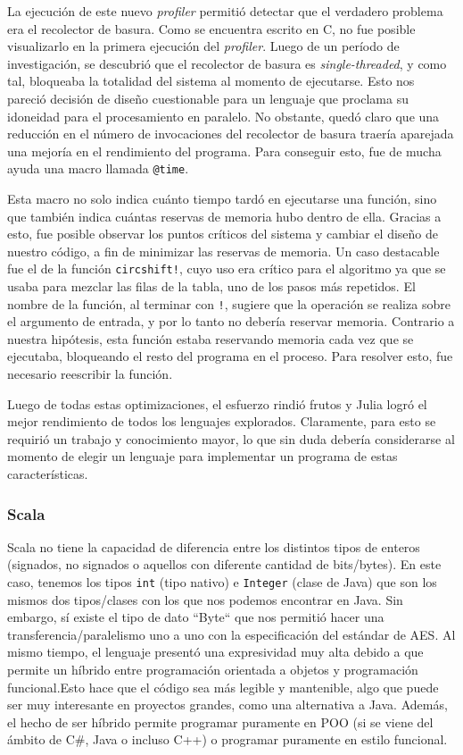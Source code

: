 \documentclass[11pt]{article}
\let\Oldsubsubsection\subsubsection
\renewcommand{\subsubsection}{\FloatBarrier\Oldsubsubsection}
\newcommand{\english}[1]{\textit{#1}}
\begin{document}
La ejecución de este nuevo \english{profiler} permitió detectar que el verdadero problema era el recolector de basura. Como se encuentra escrito en C, no fue posible visualizarlo en la primera ejecución del \english{profiler}. Luego de un período de investigación, se descubrió que el recolector de basura es \english{single-threaded}, y como tal, bloqueaba la totalidad del sistema al momento de ejecutarse. Esto nos pareció decisión de diseño cuestionable para un lenguaje que proclama su idoneidad para el procesamiento en paralelo. No obstante, quedó claro que una reducción en el número de invocaciones del recolector de basura traería aparejada una mejoría en el rendimiento del programa. Para conseguir esto, fue de mucha ayuda una macro llamada \lstinline{@time}.

Esta macro no solo indica cuánto tiempo tardó en ejecutarse una función, sino que también indica cuántas reservas de memoria hubo dentro de ella. Gracias a esto, fue posible observar los puntos críticos del sistema y cambiar el diseño de nuestro código, a fin de minimizar las reservas de memoria. Un caso destacable fue el de la función \lstinline{circshift!}, cuyo uso era crítico para el algoritmo ya que se usaba para mezclar las filas de la tabla, uno de los pasos más repetidos. El nombre de la función, al terminar con \lstinline{!}, sugiere que la operación se realiza sobre el argumento de entrada, y por lo tanto no debería reservar memoria. Contrario a nuestra hipótesis, esta función estaba reservando memoria cada vez que se ejecutaba, bloqueando el resto del programa en el proceso. Para resolver esto, fue necesario reescribir la función.

Luego de todas estas optimizaciones, el esfuerzo rindió frutos y Julia logró el mejor rendimiento de todos los lenguajes explorados. Claramente, para esto se requirió un trabajo y conocimiento mayor, lo que sin duda debería considerarse al momento de elegir un lenguaje para implementar un programa de estas características.

\subsubsection{Scala}

Scala no tiene la capacidad de diferencia entre los distintos tipos de enteros (signados, no signados o aquellos con diferente cantidad de bits/bytes). En este caso, tenemos los tipos \lstinline{int} (tipo nativo) e \lstinline{Integer} (clase de Java) que son los mismos dos tipos/clases con los que nos podemos encontrar en Java. Sin embargo, sí existe el tipo de dato ``Byte`` que nos permitió hacer una transferencia/paralelismo uno a uno con la especificación del estándar de AES. Al mismo tiempo, el lenguaje presentó una expresividad muy alta debido a que permite un híbrido entre programación orientada a objetos y programación funcional.Esto hace que el código sea más legible y mantenible, algo que puede ser muy interesante en proyectos grandes, como una alternativa a Java. Además, el hecho de ser híbrido permite programar puramente en POO (si se viene del ámbito de C\#, Java o incluso C++) o programar puramente en estilo funcional.
\end{document}
